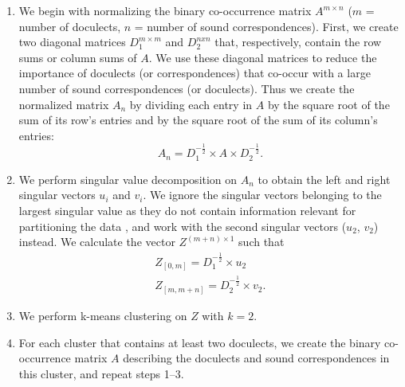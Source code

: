 \documentclass[a4paper]{article}
\begin{document}
\begin{enumerate}
\item 
We begin with normalizing the binary co-occurrence matrix
$A^{m \times n}$ ($m$ = number of doculects, $n$ = number of sound correspondences).
First, we create two diagonal matrices
$D_1^{m \times m}$ and $D_2^{n x n}$ that, respectively,
contain the row sums or column sums of $A$.
We use these diagonal matrices to reduce
the importance of doculects (or correspondences)
that co-occur with a large number
of sound correspondences (or doculects).
Thus we create the normalized matrix $A_n$
by dividing each entry in $A$ by
the square root of the sum of its row's entries
and by the square root of the sum of its column's entries:
\begin{equation*}
A_n = D_1^{-\frac{1}{2}} \times A \times D_2^{-\frac{1}{2}}.
\end{equation*}

\item
We perform singular value decomposition on $A_n$
to obtain the left and right singular vectors $u_i$ and $v_i$.
We ignore the singular vectors belonging
to the largest singular value as they do not contain
information relevant for partitioning the data \citep{kluger2003spectral},
and work with the second singular vectors ($u_2$, $v_2$) instead.
We calculate the vector $Z^{(m + n) \times 1}$ such that
\begin{align*}
Z_{[0, m]} = D_1^{-\frac{1}{2}} \times u_2\\
Z_{[m, m+n]} = D_2^{-\frac{1}{2}} \times v_2
.
\end{align*}


\item
We perform k-means clustering on $Z$ with $k = 2$.

\item
For each cluster that contains at least two doculects,
we create the binary co-occurrence matrix $A$ describing
the doculects and sound correspondences in this cluster,
and repeat steps 1--3.
\end{enumerate}
\end{document}
